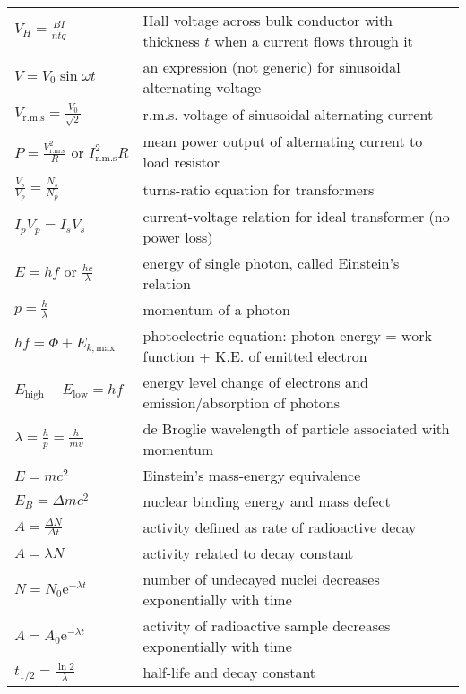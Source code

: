 {{\begin{longtable}{p{} p{}}
	$V_H = \frac{BI}{ntq}$ & Hall voltage across bulk conductor with thickness $t$ when a current flows through it\\
	$V=V_0\sin\omega t$ & an expression (not generic) for sinusoidal alternating voltage \\
	$V_\text{r.m.s}=\frac{V_0}{\sqrt{2}}$ & r.m.s. voltage of sinusoidal alternating current \\
	$P=\frac{V_\text{r.m.s}^2}{R} \text{ or } I_\text{r.m.s}^2R$ & mean power output of alternating current to load resistor\\
	$\frac{V_s}{V_p}=\frac{N_s}{N_p}$ & turns-ratio equation for transformers \\
	$I_pV_p=I_sV_s$ & current-voltage relation for ideal transformer (no power loss) \\
	$E=hf \text{ or } \frac{hc}{\lambda}$ & energy of single photon, called Einstein's relation \\
	$p = \frac{h}{\lambda}$ & momentum of a photon \\
	$hf=\Phi+E_{k,\text{max}}$ & photoelectric equation: photon energy = work function + K.E. of emitted electron\\
	$E_\text{high} - E_\text{low}=hf$ & energy level change of electrons and emission/absorption of photons \\
	$\lambda=\frac{h}{p}=\frac{h}{mv}$ & de Broglie wavelength of particle associated with momentum \\
	$E=mc^2$ & Einstein's mass-energy equivalence \\
	$E_B=\Delta mc^2$ & nuclear binding energy and mass defect \\
	$A=\frac{\Delta N}{\Delta t}$ & activity defined as rate of radioactive decay \\
	$A=\lambda N$ & activity related to decay constant \\
	$N=N_0\mathrm{e}^{-\lambda t}$ & number of undecayed nuclei decreases exponentially with time\\
	$A=A_0\mathrm{e}^{-\lambda t}$ & activity of radioactive sample decreases exponentially with time\\
	$t_{1/2}=\frac{\ln2}{\lambda}$ & half-life and decay constant \\

\end{longtable}}}
